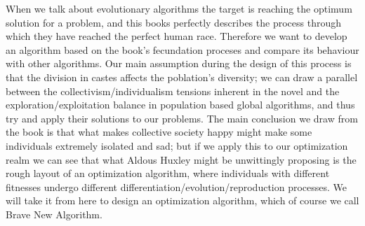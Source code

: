 When we talk about evolutionary algorithms the target is reaching the
optimum solution for a problem, and this books perfectly describes
the process through which they have reached the perfect human
race. Therefore we want to develop an algorithm based on the book's
fecundation proceses and compare its behaviour with other
algorithms. Our main assumption during the design of this process is
that the division in castes affects the
poblation's diversity; we can draw a parallel between the
collectivism/individualism tensions inherent in the novel and the
exploration/exploitation balance in population based global
algorithms, and thus try and apply their solutions to our
problems. The main conclusion we draw from the book is that what makes
collective society happy might make some individuals extremely
isolated and sad; but if we apply this to our optimization realm we
can see that what Aldous Huxley might be unwittingly proposing is the
rough layout of an optimization algorithm, where individuals with
different fitnesses undergo different
differentiation/evolution/reproduction processes. We will take it from
here to design an optimization algorithm, which of course we call Brave
New Algorithm.


